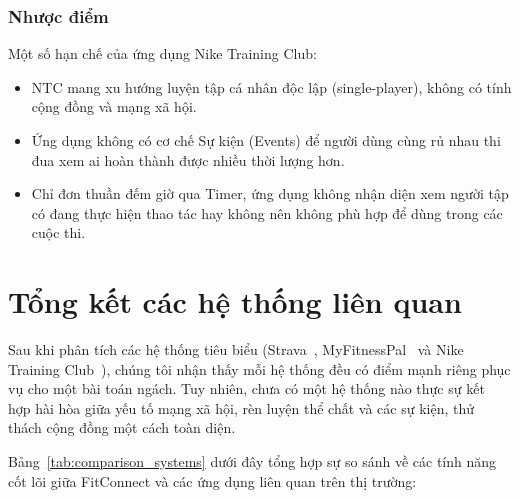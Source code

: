 \subsubsection{Nhược điểm}
Một số hạn chế của ứng dụng Nike Training Club:
\begin{itemize}
    \item NTC mang xu hướng luyện tập cá nhân độc lập (single-player), không có tính cộng đồng và mạng xã hội.
    \item Ứng dụng không có cơ chế Sự kiện (Events) để người dùng cùng rủ nhau thi đua xem ai hoàn thành được nhiều thời lượng hơn.
    \item Chỉ đơn thuần đếm giờ qua Timer, ứng dụng không nhận diện xem người tập có đang thực hiện thao tác hay không nên không phù hợp để dùng trong các cuộc thi.
\end{itemize}

\section{Tổng kết các hệ thống liên quan}
\label{sec:summary_survey}

Sau khi phân tích các hệ thống tiêu biểu (Strava~\cite{StravaWebsite}, MyFitnessPal~\cite{MyFitnessPal} và Nike Training Club~\cite{NikeTrainingClub}), chúng tôi nhận thấy mỗi hệ thống đều có điểm mạnh riêng phục vụ cho một bài toán ngách. Tuy nhiên, chưa có một hệ thống nào thực sự kết hợp hài hòa giữa yếu tố mạng xã hội, rèn luyện thể chất và các sự kiện, thử thách cộng đồng một cách toàn diện. 

Bảng~\ref{tab:comparison_systems} dưới đây tổng hợp sự so sánh về các tính năng cốt lõi giữa FitConnect và các ứng dụng liên quan trên thị trường:

